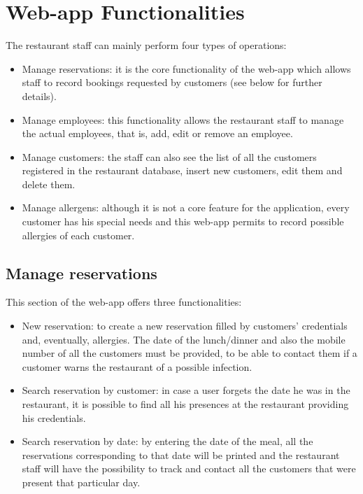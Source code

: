 \documentclass{article}
\begin{document}
\section*{Web-app Functionalities}
The restaurant staff can mainly perform four types of operations:
\begin{itemize}
    \item Manage reservations: it is the core functionality of the web-app which allows staff to record bookings requested by customers (see below for further details).
    \item Manage employees: this functionality allows the restaurant staff to manage the actual employees, that is, add, edit or remove an employee.
    \item Manage customers: the staff can also see the list of all the customers registered in the restaurant database, insert new customers, edit them and delete them.
    \item Manage allergens: although it is not a core feature for the application, every customer has his special needs and this web-app permits to record possible allergies of each customer.
\end{itemize}

\subsection*{Manage reservations}
This section of the web-app offers three functionalities:
\begin{itemize}
  \item New reservation: to create a new reservation filled by customers' credentials and, eventually, allergies. The date of the lunch/dinner and also the mobile number of all the customers must be provided, to be able to contact them if a customer warns the restaurant of a possible infection.
  \item Search reservation by customer: in case a user forgets the date he was in the restaurant, it is possible to find all his presences at the restaurant providing his credentials.
  \item Search reservation by date: by entering the date of the meal, all the reservations corresponding to that date will be printed and the restaurant staff will have the possibility to track and contact all the customers that were present that particular day.
\end{itemize}

\clearpage
\end{document}
